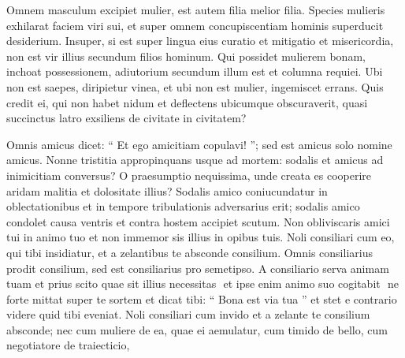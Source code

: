 \begin{biblechapter}
\begin{biblechapter}
\begin{biblechapter}
\begin{biblechapter}
\begin{biblechapter}
\begin{biblechapter}
\begin{biblechapter}
\begin{biblechapter}
\begin{biblechapter}
\begin{biblechapter}
\begin{biblechapter}
\begin{biblechapter}
\begin{biblechapter}
\begin{biblechapter}
\begin{biblechapter}
\begin{biblechapter}
\begin{biblechapter}
\begin{biblechapter}
\begin{biblechapter}
\begin{biblechapter}
\begin{biblechapter}
\begin{biblechapter}
\begin{biblechapter}
\begin{biblechapter}
\begin{biblechapter}
\begin{biblechapter}
\begin{biblechapter}
\begin{biblechapter}
\begin{biblechapter}
\begin{biblechapter}
\begin{biblechapter}
\begin{biblechapter}
\begin{biblechapter}
\begin{biblechapter}
\begin{biblechapter}
\begin{biblechapter}
 \verse Omnem masculum excipiet mulier,
 est autem filia melior filia.
 \verse Species mulieris exhilarat faciem viri sui,
 et super omnem concupiscentiam hominis superducit desiderium.
 \verse Insuper, si est super lingua eius curatio
 et mitigatio et misericordia,
 non est vir illius secundum filios hominum.
 \verse Qui possidet mulierem bonam, inchoat possessionem,
 adiutorium secundum illum est et columna requiei.
 \verse Ubi non est saepes, diripietur vinea,
 et ubi non est mulier, ingemiscet errans.
 \verse Quis credit ei, qui non habet nidum
 et deflectens ubicumque obscuraverit,
 quasi succinctus latro exsiliens de civitate in civitatem?
 
\begin{biblechapter}
\verse Omnis amicus dicet: “ Et ego amicitiam copulavi! ”;
 sed est amicus solo nomine amicus.
 Nonne tristitia appropinquans usque ad mortem:
 \verse sodalis et amicus ad inimicitiam conversus?
 \verse O praesumptio nequissima, unde creata es
 cooperire aridam malitia et dolositate illius?
 \verse Sodalis amico coniucundatur in oblectationibus
 et in tempore tribulationis adversarius erit;
 \verse sodalis amico condolet causa ventris
 et contra hostem accipiet scutum.
 \verse Non obliviscaris amici tui in animo tuo
 et non immemor sis illius in opibus tuis.
 \verse Noli consiliari cum eo, qui tibi insidiatur,
 et a zelantibus te absconde consilium.
 \verse Omnis consiliarius prodit consilium,
 sed est consiliarius pro semetipso.
 \verse A consiliario serva animam tuam
 et prius scito quae sit illius necessitas
 ­ et ipse enim animo suo cogitabit ­
 \verse ne forte mittat super te sortem
 et dicat tibi: 
\verse “ Bona est via tua ”
 et stet e contrario videre quid tibi eveniat.
 \verse Noli consiliari cum invido
 et a zelante te consilium absconde;
 nec cum muliere de ea, quae ei aemulatur,
 cum timido de bello,
 cum negotiatore de traiecticio,

\end{biblechapter}
\end{biblechapter}
\end{biblechapter}
\end{biblechapter}
\end{biblechapter}
\end{biblechapter}
\end{biblechapter}
\end{biblechapter}
\end{biblechapter}
\end{biblechapter}
\end{biblechapter}
\end{biblechapter}
\end{biblechapter}
\end{biblechapter}
\end{biblechapter}
\end{biblechapter}
\end{biblechapter}
\end{biblechapter}
\end{biblechapter}
\end{biblechapter}
\end{biblechapter}
\end{biblechapter}
\end{biblechapter}
\end{biblechapter}
\end{biblechapter}
\end{biblechapter}
\end{biblechapter}
\end{biblechapter}
\end{biblechapter}
\end{biblechapter}
\end{biblechapter}
\end{biblechapter}
\end{biblechapter}
\end{biblechapter}
\end{biblechapter}
\end{biblechapter}
\end{biblechapter}
